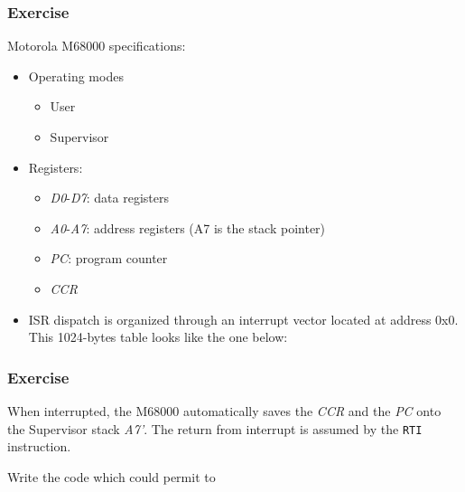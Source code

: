%
%
%

\begin{frame}
  \frametitle{Exercise}

  Motorola M68000 specifications:

  \begin{itemize}
    \item Operating modes
      \begin{itemize}
        \item User
	\item Supervisor
      \end{itemize}

    \item Registers:
      \begin{itemize}
        \item {\em D0}-{\em D7}: data registers
        \item {\em A0}-{\em A7}: address registers (A7 is the stack pointer)
        \item {\em PC}: program counter
        \item {\em CCR}
      \end{itemize}

    \item ISR dispatch is organized through an interrupt vector located at
      address 0x0. This 1024-bytes table looks like the one below:

      \-
      \begin{center}
      \end{center}
  \end{itemize}

\end{frame}

%
%
%

\begin{frame}
  \frametitle{Exercise}

  \-

  When interrupted, the M68000 automatically saves the {\em CCR} and the
  {\em PC} onto the Supervisor stack {\em A7'}. The return from interrupt is
  assumed by the {\tt RTI} instruction.

  \-

  Write the code which could permit to 

\end{frame}

%
%
%

